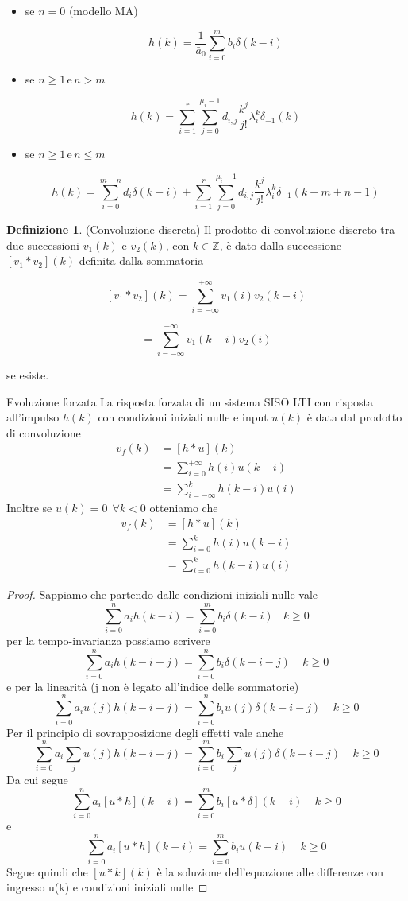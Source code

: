 \documentclass{article}
\theoremstyle{definition}
\newtheorem*{definizione}{Definizione}
\newcommand{\sisdiscrdo}{\sum_{i=0}^n a_ih(k-i)=\sum_{i=0}^m b_i\delta(k-i) \ \ \ \ k \geq 0}
\begin{document}
\begin{itemize}
	\item se \( n = 0 \) (modello MA)
	
	\[
	h(k) = \frac{1}{\bar{a}_0} \sum_{i=0}^m b_i \delta(k-i)
	\]
	
	\item se \( n \geq 1 \, \text{e} \, n > m \)
	
	\[
	h(k) = \sum_{i=1}^r \sum_{j=0}^{\mu_i-1} d_{i,j} \frac{k^j}{j!} \lambda_i^k \delta_{-1}(k)
	\]
	
	\item se \( n \geq 1 \, \text{e} \, n \leq m \)
	
	\[
	h(k) = \sum_{i=0}^{m-n} d_i \delta(k-i) + \sum_{i=1}^r \sum_{j=0}^{\mu_i-1} d_{i,j} \frac{k^j}{j!} \lambda_i^k \delta_{-1}(k-m+n-1)
	\]
\end{itemize}
\begin{definizione}(Convoluzione discreta)
	Il prodotto di convoluzione discreto tra due successioni \( v_1(k) \) e \( v_2(k) \), con \( k \in \mathbb{Z} \), è dato dalla successione \( [v_1 * v_2](k) \) definita dalla sommatoria
	
	\[
	[v_1 * v_2](k) = \sum_{i=-\infty}^{+\infty} v_1(i)v_2(k-i)
	\]
	
	\[
	= \sum_{i=-\infty}^{+\infty} v_1(k-i)v_2(i) 
	\]
	
	se esiste.
\end{definizione}
\begin{teo}{Evoluzione forzata}{}
La risposta forzata di un sistema SISO LTI con risposta all'impulso $h(k)$ con condizioni iniziali nulle e input $u(k)$ è data dal prodotto di convoluzione 
\begin{align*}
	v_f(k)&=[h*u](k) \\
	&=\sum_{i=0}^{+\infty} h(i)u(k-i) \\
	&=\sum _{i=-\infty}^k h(k-i)u(i)
 \end{align*}
Inoltre se $u(k)=0 \ \ \forall k < 0 $  otteniamo che 
\begin{align*}
	v_f(k)&=[h*u](k) \\
	&=\sum_{i=0}^{k} h(i)u(k-i) \\
	&=\sum _{i=0}^k h(k-i)u(i)
\end{align*}
\end{teo}
\begin{proof}
	Sappiamo che partendo dalle condizioni iniziali nulle vale 
	$$\sisdiscrdo$$
	per la tempo-invarianza possiamo scrivere 
	$$\sum_{i=0}^{n}a_ih(k-i-j)=\sum_{i=0}^{n}b_i\delta(k-i-j) \ \ \ \ \ k \geq 0 $$
	e per la linearità (j non è legato all'indice delle sommatorie)
	$$\sum_{i=0}^{n}a_iu(j)h(k-i-j)=\sum_{i=0}^{n}b_iu(j)\delta(k-i-j) \ \ \ \ \ k \geq 0 $$
	Per il principio di sovrapposizione degli effetti vale anche 
	$$\sum_{i=0}^{n}a_i \sum_j u(j)h(k-i-j)=\sum_{i=0}^{m}b_i\sum_ju(j)\delta(k-i-j) \ \ \ \ \ k \geq 0$$
	Da cui segue 
	$$\sum_{i=0}^{n}a_i [u*h](k-i)=\sum_{i=0}^{m}b_i [u*\delta](k-i) \ \ \ \ \ k \geq 0$$
	e 
	$$\sum_{i=0}^{n}a_i [u*h](k-i)=\sum_{i=0}^{m}b_i u(k-i) \ \ \ \ \ k \geq 0$$
	Segue quindi che $[u*k](k)$ è la soluzione dell'equazione alle differenze con ingresso u(k) e condizioni iniziali nulle 
\end{proof}
\end{document}
